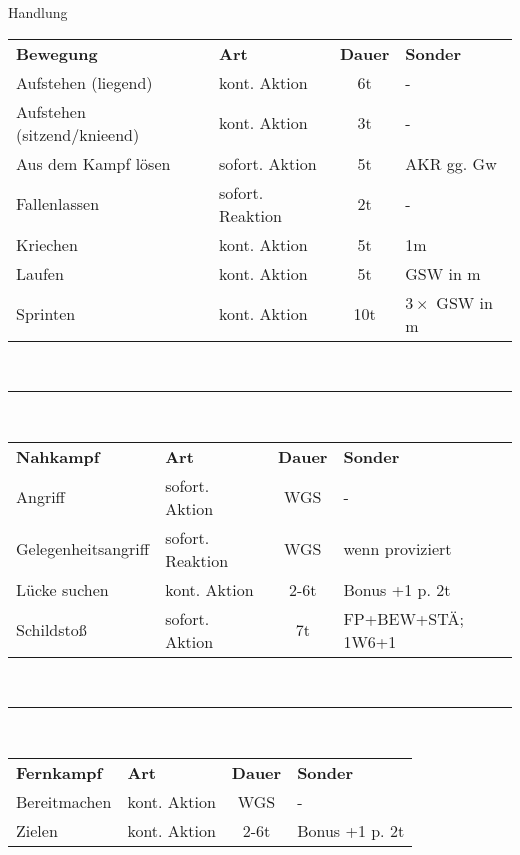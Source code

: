 \documentclass[a4paper, 11pt]{article}
\begin{document}
\begin{multicols}{2}
        \begin{spmbox}{Handlung}
                \begin{tabularx}{\linewidth}{l X c l}
                \rowcolor{spmtabelle2}
                \textbf{Bewegung} & \textbf{Art} & \textbf{Dauer} & \textbf{Sonder} \\
                Aufstehen (liegend) & kont. Aktion & 6t & - \\
                Aufstehen (sitzend/knieend) & kont. Aktion & 3t & - \\
                Aus dem Kampf lösen & sofort. Aktion & 5t & AKR gg. Gw \\
                Fallenlassen & sofort. Reaktion & 2t & - \\
                Kriechen & kont. Aktion & 5t & 1m \\
                Laufen & kont. Aktion & 5t & GSW in m \\
                Sprinten & kont. Aktion & 10t & $3\times$ GSW in m\\        
        \end{tabularx}\\
        \rule{\linewidth}{.2em}\\
        \begin{tabularx}{\linewidth}{l X c l}
                \rowcolor{spmtabelle2}
                \textbf{Nahkampf} & \textbf{Art} & \textbf{Dauer} & \textbf{Sonder} \\
                Angriff & sofort. Aktion & WGS & - \\
                Gelegenheitsangriff & sofort. Reaktion & WGS & wenn proviziert \\
                Lücke suchen & kont. Aktion & 2-6t & Bonus +1 p. 2t \\
                Schildstoß & sofort. Aktion & 7t & FP+BEW+STÄ; 1W6+1 \\
        \end{tabularx}\\
        \rule{\linewidth}{.2em}\\
        \begin{tabularx}{\linewidth}{l X c l}
                \rowcolor{spmtabelle2}
                \textbf{Fernkampf} & \textbf{Art} & \textbf{Dauer} & \textbf{Sonder} \\
                Bereitmachen & kont. Aktion & WGS & - \\
                Zielen & kont. Aktion & 2-6t& Bonus +1 p. 2t \\

\end{tabularx}
\end{spmbox}
\end{multicols}
\end{document}

